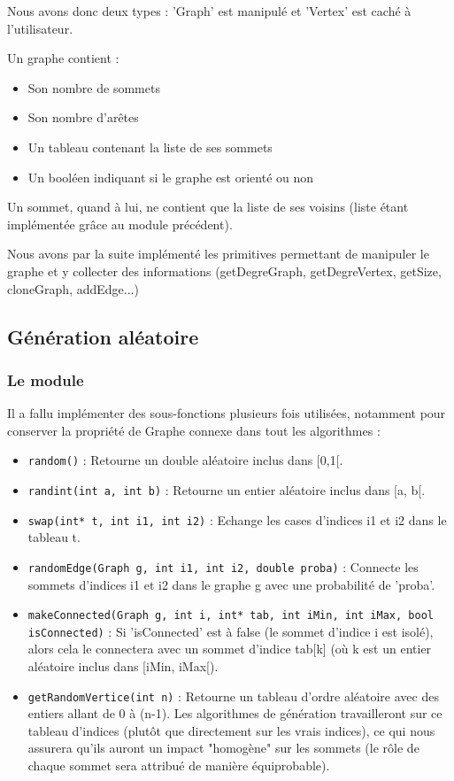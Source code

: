 \documentclass[a4paper,10pt]{article}
\newcommand*{\itemb}{\item[$\bullet$]}
\begin{document}
Nous avons donc deux types : 'Graph' est manipulé et 'Vertex' est caché à l'utilisateur.

Un graphe contient :
\begin{itemize}
\itemb Son nombre de sommets
\itemb Son nombre d'arêtes
\itemb Un tableau contenant la liste de ses sommets
\itemb Un booléen indiquant si le graphe est orienté ou non
\end{itemize}

Un sommet, quand à lui, ne contient que la liste de ses voisins (liste étant implémentée grâce au module précédent).

Nous avons par la suite implémenté les primitives permettant de manipuler le graphe et y collecter des informations (getDegreGraph, getDegreVertex, getSize, cloneGraph, addEdge...)

\subsection{Génération aléatoire}

\subsubsection{Le module}

Il a fallu implémenter des sous-fonctions plusieurs fois utilisées, notamment pour conserver la propriété de Graphe connexe dans tout les algorithmes :
\BlankLine
\begin{itemize}
	\itemb \texttt{random()} : Retourne un double aléatoire inclus dans [0,1[.
	\itemb \texttt{randint(int a, int b)} : Retourne un entier aléatoire inclus dans [a, b[.
	\itemb \texttt{swap(int* t, int i1, int i2)} : Echange les cases d'indices i1 et i2 dans le tableau t.
	\itemb \texttt{randomEdge(Graph g, int i1, int i2, double proba)} : Connecte les sommets d'indices i1 et i2 dans le graphe g avec une probabilité de 'proba'.
	\itemb \texttt{makeConnected(Graph g, int i, int* tab, int iMin, int iMax, bool isConnected)} : Si 'isConnected' est à false (le sommet d'indice i est isolé), alors cela le connectera avec un sommet d'indice tab[k] (où k est un entier aléatoire inclus dans [iMin, iMax[).
	\itemb \texttt{getRandomVertice(int n)} : Retourne un tableau d'ordre aléatoire avec des entiers allant de 0 à (n-1). Les algorithmes de génération travailleront sur ce tableau d'indices (plutôt que directement sur les vrais indices), ce qui nous assurera qu'ils auront un impact "homogène" sur les sommets (le rôle de chaque sommet sera attribué de manière équiprobable).
\end{itemize}
\end{document}
